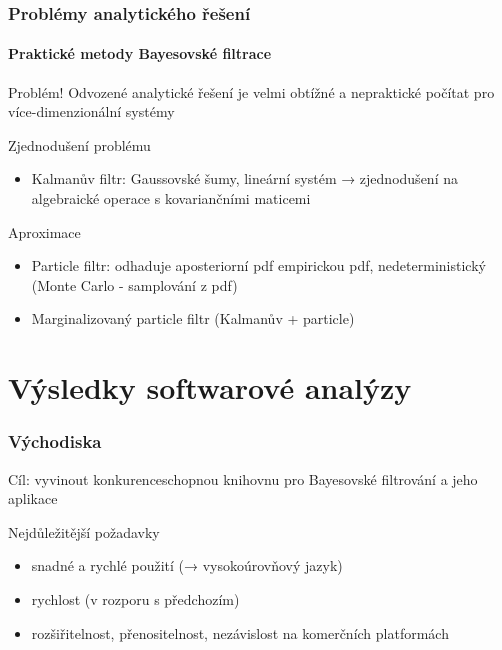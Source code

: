 \documentclass[12pt]{beamer}
\begin{document}
\begin{frame}
	\frametitle{Problémy analytického řešení}
	\framesubtitle{Praktické metody Bayesovské filtrace}

	\begin{alertblock}{Problém!}
		Odvozené analytické řešení je velmi obtížné a nepraktické počítat pro více-dimenzionální
		systémy
	\end{alertblock}

	\begin{block}{Zjednodušení problému}
		\begin{itemize}
			\item Kalmanův filtr: Gaussovské šumy, lineární systém → zjednodušení
			na algebraické operace s kovariančními maticemi
		\end{itemize}
	\end{block}

	\begin{block}{Aproximace}
		\begin{itemize}
			\item Particle filtr: odhaduje aposteriorní pdf empirickou pdf,
			nedeterministický (Monte Carlo - samplování z pdf)
			\item Marginalizovaný particle filtr (Kalmanův + particle)
		\end{itemize}
	\end{block}

\end{frame}

\section{Výsledky softwarové analýzy}

\begin{frame}
	\frametitle{Východiska}

	{\large Cíl: vyvinout konkurenceschopnou knihovnu pro Bayesovské filtrování a jeho aplikace}

	\vspace{8mm}

	\begin{block}{Nejdůležitější požadavky}
		\begin{itemize}
			\item snadné a rychlé použití {\scriptsize (→ vysokoúrovňový jazyk)}
			\item rychlost {\scriptsize (v rozporu s předchozím)}
			\item rozšiřitelnost, přenositelnost, nezávislost na komerčních platformách
		\end{itemize}
 	\end{block}
\end{frame}
\end{document}
